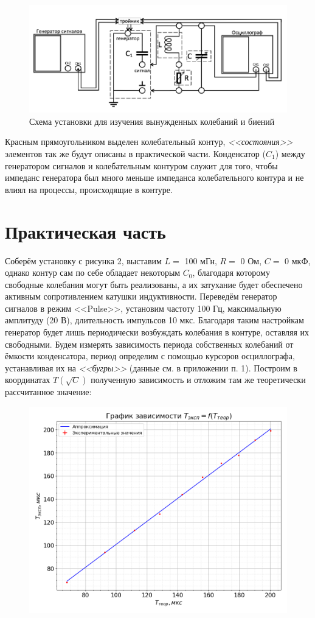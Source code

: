 \documentclass[a4paper,12pt]{extarticle}
\begin{document}
\begin{figure}[h!]
    \centering
    \includegraphics[width=0.8\linewidth]{ustan2.png}
    \caption{Схема установки для изучения вынужденных колебаний и биений}
\end{figure}

Красным прямоугольником выделен колебательный контур, \textit{<<состояния>>} элементов так же будут описаны в практической части. Конденсатор ($C_1$) между генератором сигналов и колебательным контуром служит для того, чтобы импеданс генератора был много меньше импеданса колебательного контура и не влиял на процессы, происходящие в контуре.

\newpage
\section{Практическая часть}
Соберём установку с рисунка 2, выставим $L =$ 100 мГн, $R =$ 0 Ом, $C =$ 0 мкФ, однако контур сам по себе обладает некоторым $C_0$, благодаря которому свободные колебания могут быть реализованы, а их затухание будет обеспечено активным сопротивлением катушки индуктивности. Переведём генератор сигналов в режим <<Pulse>>, установим частоту 100 Гц, максимальную амплитуду (20 В), длительность импульсов 10 мкс. Благодаря таким настройкам генератор будет лишь периодически возбуждать колебания в контуре, оставляя их свободными. Будем измерять зависимость периода собственных колебаний от ёмкости конденсатора, период определим с помощью курсоров осциллографа, устанавливая их на \textit{<<бугры>>} (данные см. в приложении п. 1). Построим в координатах $T(\sqrt{C})$ полученную зависимость и отложим там же теоретически рассчитанное значение:

\begin{figure}[h!]
    \centering
    \includegraphics[width=0.8\linewidth]{T(C).png}

\end{figure}
\end{document}
